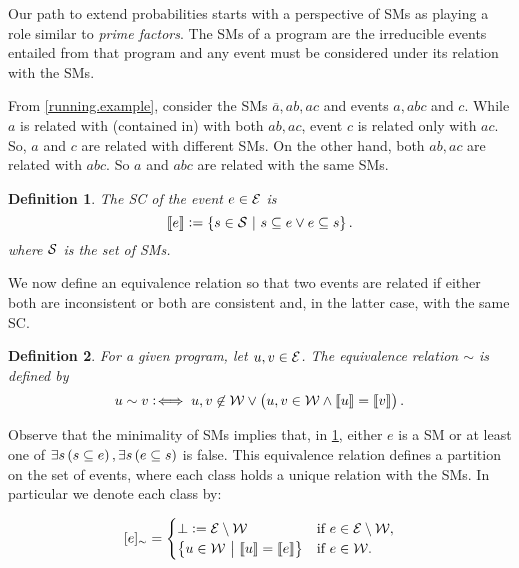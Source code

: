 \documentclass[a4paper, 10pt]{article}
\newtheorem{definition}{Definition}
\newcommand{\co}[1]{\ensuremath{\overline{#1}}}
\newcommand{\fml}[1]{\ensuremath{{\cal #1}}}
\newcommand{\stablecore}[1]{\ensuremath{\left\llbracket #1 \right\rrbracket}}
\newcommand{\class}[1]{\ensuremath{[{#1}]_{\sim}}}
\newcommand{\inconsistent}{\bot}
\newcommand{\given}{\ensuremath{~\middle|~}}
\begin{document}
Our path to extend probabilities starts with a perspective of \aclp{SM} as playing a role similar to \emph{prime factors}.  The \aclp{SM} of a program are the irreducible events entailed from that program and any event must be considered under its relation with the \aclp{SM}.

From  \cref{running.example}, consider the \acp{SM} $\co{a}, ab, ac$ and events $a, abc$ and $c$. While $a$ is related with (contained in) with both $ab, ac$, event $c$ is related only with $ac$. So, $a$ and $c$ are related with different \acp{SM}. On the other hand, both $ab, ac$ are related with $abc$. So $a$ and $abc$ are related with the same \aclp{SM}.

\begin{definition}\label{def:stable.core}
    The \emph{\ac{SC}} of the event $e\in \fml{E}$ is
    \begin{equation}
        \stablecore{e} := \set{s \in \fml{S} \given s \subseteq e \vee e \subseteq s}. \label{eq:stable.core}
    \end{equation}
    where $\fml{S}$ is the set of \aclp{SM}.
\end{definition}

We now define an equivalence relation so that two events are related if either both are inconsistent or both are consistent and, in the latter case, with the same \acl{SC}.

\begin{definition}\label{def:equiv.rel}
    For a given program, let $u, v \in \fml{E}$. The equivalence relation $\sim$ is defined by
    \begin{equation}
        u \sim v :\!\iff u,v \not\in\fml{W} \vee \del{u,v \in \fml{W} \wedge \stablecore{u} = \stablecore{v}}.\label{eq:equiv.rel}
    \end{equation}
\end{definition}

Observe that the minimality of \aclp{SM} implies that, in \cref{def:stable.core}, either $e$ is a \acl{SM} or at least one of $\exists s \del{s \subseteq e}, \exists s \del{e \subseteq s}$ is false. This equivalence relation defines a partition on the set of events, where each class holds a unique relation with the \aclp{SM}. In particular we denote each class by:

\begin{equation}
    \class{e} =
    \begin{cases}
        \inconsistent := \fml{E} \setminus \fml{W}
         & \text{if~} e \in \fml{E} \setminus \fml{W}, \\
        \set{u \in \fml{W} \given \stablecore{u} = \stablecore{e}}
         & \text{if~} e \in \fml{W}.
    \end{cases}\label{eq:event.class}
\end{equation}
\end{document}
